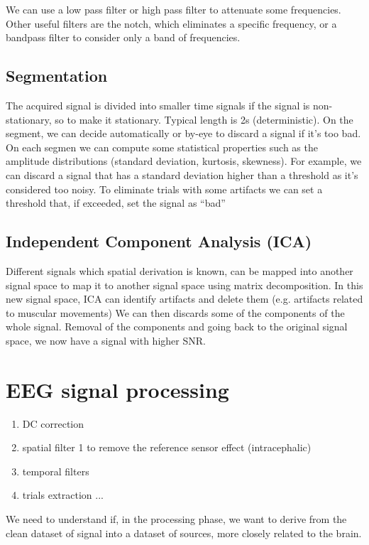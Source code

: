  We can use a low pass filter or high pass filter to attenuate some frequencies. Other useful filters are the notch, which eliminates a specific frequency, or a bandpass filter to consider only a band of frequencies.

 \subsection{Segmentation}
 The acquired signal is divided into smaller time signals if the signal is non-stationary, so to make it stationary. Typical length is 2s (deterministic). On the segment, we can decide automatically or by-eye to discard a signal if it's too bad. On each segmen we can compute some statistical properties such as the amplitude distributions (standard deviation, kurtosis, skewness). For example, we can discard a signal that has a standard deviation higher than a threshold as it's considered too noisy. To eliminate trials with some artifacts we can set a threshold that, if exceeded, set the signal as ``bad''

 \subsection{Independent Component Analysis (ICA)}
 Different signals which spatial derivation is known, can be mapped into another signal space to map it to another signal space using matrix decomposition. In this new signal space, ICA can identify artifacts and delete them (e.g. artifacts related to muscular movements)
 We can then discards some of the components of the whole signal. Removal of the components and going back to the original signal space, we now have a signal with higher SNR.

 \section{EEG signal processing}
 \begin{enumerate}
   \item DC correction
   \item  spatial filter 1 to remove the reference sensor effect (intracephalic)
   \item temporal filters
   \item trials extraction
   ...
 \end{enumerate}

 We need to understand if, in the processing phase, we want to derive from the clean dataset of signal into a dataset of sources, more closely related to the brain.

